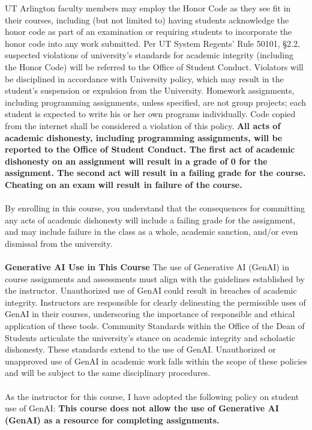 \documentclass[12pt]{article}
\begin{document}
\noindent UT Arlington faculty members may employ the Honor Code as they see fit in their courses, including (but not limited to) having students acknowledge the honor code as part of an examination or requiring students to incorporate the honor code into any work submitted.  Per UT System Regents' Rule 50101, \S 2.2, suspected violations of university's standards for academic integrity (including the Honor Code) will be referred to the Office of Student Conduct. Violators will be disciplined in accordance with University policy, which may result in the student's suspension or expulsion from the University.  Homework assignments, including programming assignments, unless specified, are not group projects; each student is expected to write his or her own programs individually. Code copied from the internet shall be considered a violation of this policy.
\noindent 
\textbf{All acts of academic dishonesty, including programming assignments, will be reported to the Office of Student Conduct.  The first act of academic dishonesty on an assignment will result in a grade of 0 for the assignment. The second act will result in a failing grade for the course.  Cheating on an exam will result in failure of the course.}\\\\
\noindent
By enrolling in this course, you understand that the consequences for committing any acts of academic dishonesty will include a failing grade for the assignment, and may include failure in the class as a whole, academic sanction, and/or even dismissal from the university.  \\\\
\noindent\textbf{Generative AI Use in This Course}
The use of Generative AI (GenAI) in course assignments and assessments must align with the guidelines established by the instructor. Unauthorized use of GenAI could result in breaches of academic integrity. Instructors are responsible for clearly delineating the permissible uses of GenAI in their courses, underscoring the importance of responsible and ethical application of these tools.
Community Standards within the Office of the Dean of Students articulate the university's stance on academic integrity and scholastic dishonesty. These standards extend to the use of GenAI. Unauthorized or unapproved use of GenAI in academic work falls within the scope of these policies and will be subject to the same disciplinary procedures.\\\\
\noindent As the instructor for this course, I have adopted the following policy on student use of GenAI: \textbf{This course does not allow the use of Generative AI (GenAI) as a resource for completing assignments.}\\\\ 
\end{document}
